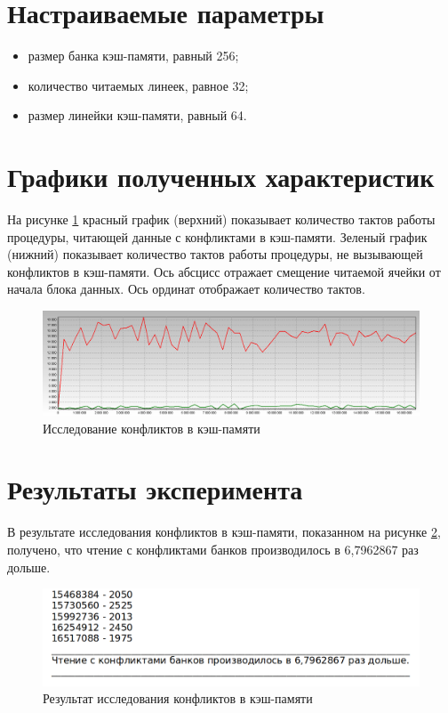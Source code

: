\section{Настраиваемые параметры}

\begin{itemize}
	\item размер банка кэш-памяти, равный 256;
	\item количество читаемых линеек, равное 32;
	\item размер линейки кэш-памяти, равный 64.
\end{itemize}

\section{Графики полученных характеристик}

На рисунке \ref{img:conflict} красный график (верхний) показывает количество тактов работы процедуры, читающей данные с конфликтами в кэш-памяти. Зеленый график (нижний) показывает количество тактов работы процедуры, не вызывающей конфликтов в кэш-памяти. Ось абсцисс отражает смещение читаемой ячейки от начала блока данных. Ось ординат отображает количество тактов.

\begin{figure}[H]
	\begin{center}
		\includegraphics[scale=0.3]{img/conflict.jpg}
	\end{center}
	\captionsetup{justification=centering}
	\caption{Исследование конфликтов в кэш-памяти}
	\label{img:conflict}
\end{figure}

\section{Результаты эксперимента}

В результате исследования конфликтов в кэш-памяти, показанном на рисунке \ref{img:conflict_result}, получено, что чтение с конфликтами банков производилось в 6,7962867 раз дольше.

\begin{figure}[H]
	\begin{center}
		\includegraphics[scale=0.4]{img/conflict_result.png}
	\end{center}
	\captionsetup{justification=centering}
	\caption{Результат исследования конфликтов в кэш-памяти}
	\label{img:conflict_result}
\end{figure}

